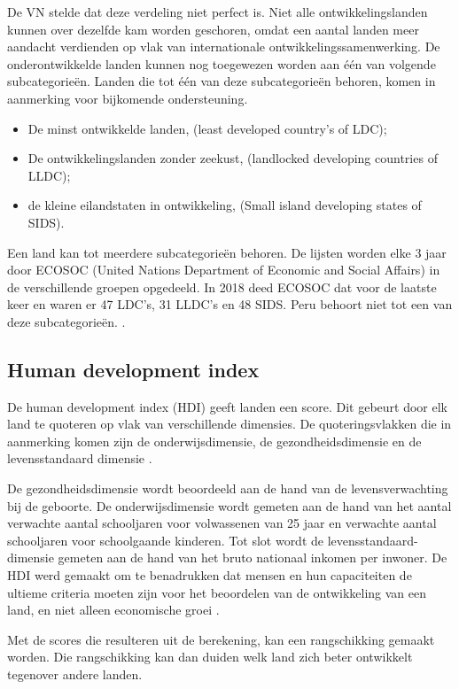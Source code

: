 De VN stelde dat deze verdeling niet perfect is. Niet alle ontwikkelingslanden kunnen over dezelfde kam worden geschoren, omdat een aantal landen meer aandacht verdienden op vlak van internationale ontwikkelingssamenwerking. De onderontwikkelde landen kunnen  nog toegewezen worden aan één van volgende subcategorieën. Landen die tot één van deze subcategorieën behoren, komen in aanmerking voor bijkomende ondersteuning.

\begin{itemize}
\item De minst ontwikkelde landen, (least developed country's of LDC);
\item De ontwikkelingslanden zonder zeekust, (landlocked developing countries of LLDC);
\item de kleine eilandstaten in ontwikkeling, (Small island developing states of SIDS).
\end{itemize}
\autocite{MarcJ.Bossuyt2005}

Een land kan tot meerdere subcategorieën behoren. De lijsten worden elke 3 jaar door ECOSOC (United Nations Department of Economic and Social Affairs) in de verschillende groepen opgedeeld. \autocite{ecosoc2018} In 2018 deed ECOSOC dat voor de laatste keer en waren er 47 LDC's, 31 LLDC's en 48 SIDS. Peru behoort niet tot een van deze subcategorieën. \autocite{MarcJ.Bossuyt2005}.

\subsection{Human development index}
De human development index (HDI) geeft landen een score. Dit gebeurt door elk land te quoteren op vlak van verschillende dimensies. De quoteringsvlakken die in aanmerking komen zijn de onderwijsdimensie, de gezondheidsdimensie en de levensstandaard dimensie \autocite{UNDP2019}.

De gezondheidsdimensie wordt beoordeeld aan de hand van de levensverwachting bij de geboorte. De onderwijsdimensie wordt gemeten aan de hand van het aantal verwachte aantal schooljaren voor volwassenen van 25 jaar en verwachte aantal schooljaren voor schoolgaande kinderen. Tot slot wordt de levensstandaard-dimensie gemeten aan de hand van het bruto nationaal inkomen per inwoner. De HDI werd gemaakt om te benadrukken dat mensen en hun capaciteiten de ultieme criteria moeten zijn voor het beoordelen van de ontwikkeling van een land, en niet alleen economische groei \autocite{UNDP2019}.

Met de scores die resulteren uit de berekening, kan een rangschikking gemaakt worden. Die rangschikking kan dan duiden welk land zich beter ontwikkelt tegenover andere landen. 

